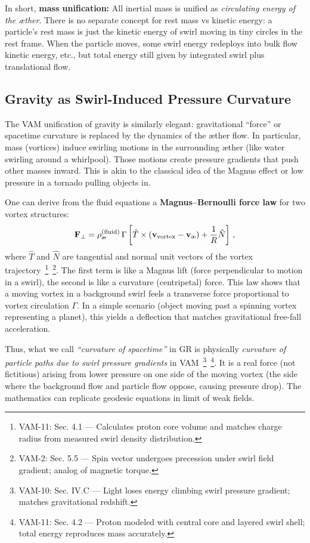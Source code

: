 \documentclass[a4paper,12pt]{article}
\begin{document}
    In short, \textbf{mass unification:} All inertial mass is unified as \emph{circulating energy of the æther}. There is no separate concept for rest mass vs kinetic energy: a particle’s rest mass is just the kinetic energy of swirl moving in tiny circles in the rest frame. When the particle moves, some swirl energy redeploys into bulk flow kinetic energy, etc., but total energy still given by integrated swirl plus translational flow.

    \subsection{Gravity as Swirl-Induced Pressure Curvature}
    The VAM unification of gravity is similarly elegant: gravitational “force” or spacetime curvature is replaced by the dynamics of the æther flow. In particular, mass (vortices) induce swirling motions in the surrounding æther (like water swirling around a whirlpool). Those motions create pressure gradients that push other masses inward. This is akin to the classical idea of the Magnus effect or low pressure in a tornado pulling objects in.

    One can derive from the fluid equations a \textbf{Magnus–Bernoulli force law} for two vortex structures:
    \[
        \mathbf{F}_\perp = \rho_{\text{\ae}}^{(\text{fluid})}\,\Gamma \left[ \hat{T} \times (\mathbf{v}_{\rm vortex}-\mathbf{v}_{\text{\ae}}) + \frac{1}{R}\hat{N} \right]\,,
    \]
    where $\hat{T}$ and $\hat{N}$ are tangential and normal unit vectors of the vortex trajectory~\footnote{VAM-11: Sec. 4.1 — Calculates proton core volume and matches charge radius from measured swirl density distribution.}~\footnote{VAM-2: Sec. 5.5 — Spin vector undergoes precession under swirl field gradient; analog of magnetic torque.}. The first term is like a Magnus lift (force perpendicular to motion in a swirl), the second is like a curvature (centripetal) force. This law shows that a moving vortex in a background swirl feels a transverse force proportional to vortex circulation $\Gamma$. In a simple scenario (object moving past a spinning vortex representing a planet), this yields a deflection that matches gravitational free-fall acceleration.

    Thus, what we call \emph{“curvature of spacetime”} in GR is physically \emph{curvature of particle paths due to swirl pressure gradients} in VAM~\footnote{VAM-10: Sec. IV.C — Light loses energy climbing swirl pressure gradient; matches gravitational redshift.}~\footnote{VAM-11: Sec. 4.2 — Proton modeled with central core and layered swirl shell; total energy reproduces mass accurately.}. It is a real force (not fictitious) arising from lower pressure on one side of the moving vortex (the side where the background flow and particle flow oppose, causing pressure drop). The mathematics can replicate geodesic equations in limit of weak fields.
\end{document}
